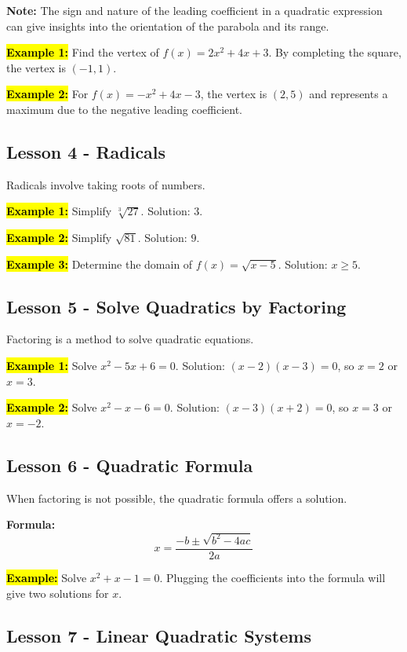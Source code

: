 \documentclass[12pt,a4paper]{article}
\begin{document}
\textbf{Note:} The sign and nature of the leading coefficient in a quadratic expression can give insights into the orientation of the parabola and its range.

\textbf{\hl{Example 1:}} Find the vertex of \(f(x) = 2x^2 + 4x + 3\). By completing the square, the vertex is \((-1, 1)\).

\textbf{\hl{Example 2:}} For \(f(x) = -x^2 + 4x - 3\), the vertex is \((2, 5)\) and represents a maximum due to the negative leading coefficient.

\subsection*{Lesson 4 - Radicals}
Radicals involve taking roots of numbers.

\textbf{\hl{Example 1:}} Simplify \(\sqrt[3]{27}\). Solution: \(3\).

\textbf{\hl{Example 2:}} Simplify \(\sqrt{81}\). Solution: \(9\).

\textbf{\hl{Example 3:}} Determine the domain of \(f(x) = \sqrt{x - 5}\). Solution: \(x \geq 5\).

\subsection*{Lesson 5 - Solve Quadratics by Factoring}
Factoring is a method to solve quadratic equations.

\textbf{\hl{Example 1:}} Solve \(x^2 - 5x + 6 = 0\). Solution: \((x - 2)(x - 3) = 0\), so \(x = 2\) or \(x = 3\).

\textbf{\hl{Example 2:}} Solve \(x^2 - x - 6 = 0\). Solution: \((x - 3)(x + 2) = 0\), so \(x = 3\) or \(x = -2\).

\subsection{Lesson 6 - Quadratic Formula}
When factoring is not possible, the quadratic formula offers a solution.

\textbf{Formula:}
\[x = \frac{-b \pm \sqrt{b^2 - 4ac}}{2a}\]

\textbf{\hl{Example:}} Solve \(x^2 + x - 1 = 0\). Plugging the coefficients into the formula will give two solutions for \(x\).

\subsection{Lesson 7 - Linear Quadratic Systems}
\end{document}
